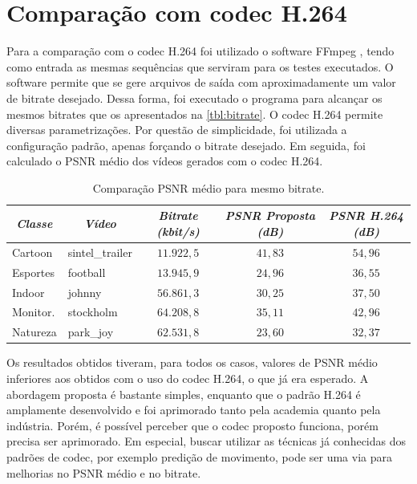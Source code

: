 \documentclass[cic,tc]{iiufrgs}
\begin{document}
\section{Comparação com codec H.264}
Para a comparação com o codec H.264 foi utilizado o software FFmpeg \cite{FFmpeg}, tendo como entrada
as mesmas sequências que serviram para os testes executados. 
O software permite que se gere arquivos de saída com aproximadamente um valor de bitrate desejado.
Dessa forma, foi executado o programa para alcançar os mesmos bitrates que os apresentados 
na \autoref{tbl:bitrate}.
O codec H.264 permite diversas parametrizações.
Por questão de simplicidade, foi utilizada a configuração padrão, apenas forçando o bitrate desejado.
Em seguida, foi calculado o PSNR médio dos vídeos gerados com o codec H.264.

\begin{table}[h]
    \caption{Comparação PSNR médio para mesmo bitrate.}
    \centering
        \begin{tabular}{|l|l|c|c|c|}
          \hline
          \multicolumn{1}{|c}{\textit{Classe}} & 
          \multicolumn{1}{|c}{\textit{Vídeo}} & 
          \multicolumn{1}{|c|}{\textit{Bitrate (kbit/s)}} &
          \multicolumn{1}{|c}{\textit{PSNR Proposta (dB)}} & 
          \multicolumn{1}{|c|}{\textit{PSNR H.264 (dB)}} \\
          \hline
          \hline
          Cartoon & sintel\_trailer & $11.922,5$ & $41,83$ & $54,96$ \\
          Esportes & football & $13.945,9$ & $24,96$ & $36,55$ \\
          Indoor & johnny & $56.861,3$ & $30,25$ & $37,50$ \\
          Monitor. & stockholm & $64.208,8$ & $35,11$ & $42,96$ \\
          Natureza & park\_joy & $62.531,8$ & $23,60$ & $32,37$ \\
          \hline
        \end{tabular}
    \label{tbl:bitrateh264}
\end{table}

Os resultados obtidos tiveram, para todos os casos, valores de PSNR médio inferiores
aos obtidos com o uso do codec H.264, o que já era esperado.
A abordagem proposta é bastante simples, enquanto que o padrão H.264 é amplamente 
desenvolvido e foi aprimorado tanto pela 
academia quanto pela indústria.
Porém, é possível perceber que 
o codec proposto funciona, porém precisa ser aprimorado.
Em especial, buscar utilizar as técnicas já conhecidas dos padrões de codec, 
por exemplo predição de movimento, pode 
ser uma via para melhorias no PSNR médio e no bitrate.
\end{document}
